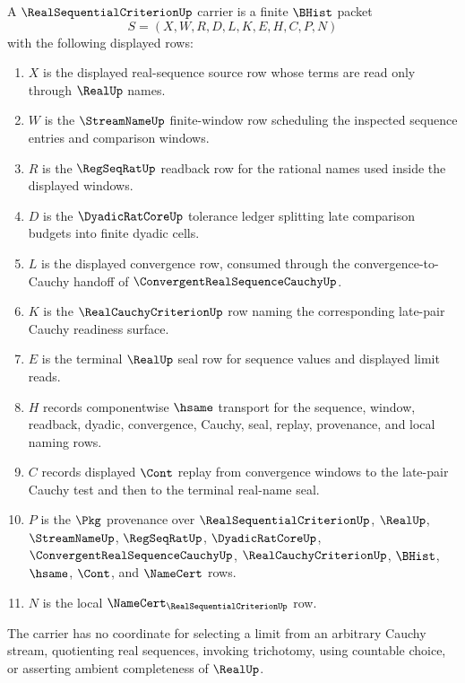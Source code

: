 \begin{definition}
\label{def:real-sequential-criterion-carrier}
A $\RealSequentialCriterionUp$ carrier is a finite $\BHist$ packet
$$
S=(X,W,R,D,L,K,E,H,C,P,N)
$$
with the following displayed rows:
\begin{enumerate}
\item $X$ is the displayed real-sequence source row whose terms are read only through $\RealUp$ names.
\item $W$ is the $\StreamNameUp$ finite-window row scheduling the inspected sequence entries and comparison windows.
\item $R$ is the $\RegSeqRatUp$ readback row for the rational names used inside the displayed windows.
\item $D$ is the $\DyadicRatCoreUp$ tolerance ledger splitting late comparison budgets into finite dyadic cells.
\item $L$ is the displayed convergence row, consumed through the convergence-to-Cauchy handoff of $\ConvergentRealSequenceCauchyUp$.
\item $K$ is the $\RealCauchyCriterionUp$ row naming the corresponding late-pair Cauchy readiness surface.
\item $E$ is the terminal $\RealUp$ seal row for sequence values and displayed limit reads.
\item $H$ records componentwise $\hsame$ transport for the sequence, window, readback, dyadic, convergence, Cauchy, seal, replay, provenance, and local naming rows.
\item $C$ records displayed $\Cont$ replay from convergence windows to the late-pair Cauchy test and then to the terminal real-name seal.
\item $P$ is the $\Pkg$ provenance over $\RealSequentialCriterionUp$, $\RealUp$, $\StreamNameUp$, $\RegSeqRatUp$, $\DyadicRatCoreUp$, $\ConvergentRealSequenceCauchyUp$, $\RealCauchyCriterionUp$, $\BHist$, $\hsame$, $\Cont$, and $\NameCert$ rows.
\item $N$ is the local $\NameCert_{\RealSequentialCriterionUp}$ row.
\end{enumerate}
The carrier has no coordinate for selecting a limit from an arbitrary Cauchy stream, quotienting real sequences, invoking trichotomy, using countable choice, or asserting ambient completeness of $\RealUp$.
\end{definition}

